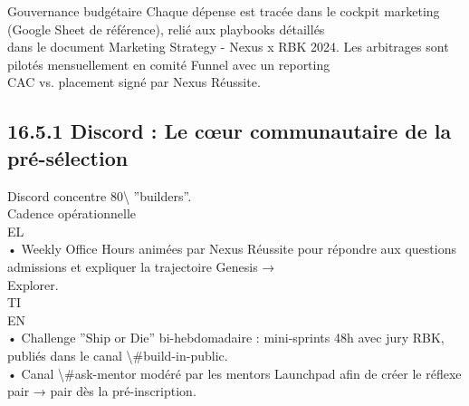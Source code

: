 \vspace{0.5em}
\vspace{0.5em}
Gouvernance budgétaire Chaque dépense est tracée dans le cockpit marketing (Google Sheet de référence), relié aux playbooks détaillés\\
dans le document Marketing Strategy - Nexus x RBK 2024. Les arbitrages sont pilotés mensuellement en comité Funnel avec un reporting\\
CAC vs. placement signé par Nexus Réussite.\\
\vspace{0.5em}
\vspace{0.5em}
\subsection{16.5.1 Discord : Le cœur communautaire de la pré-sélection}
Discord concentre 80\textbackslash{}%
”builders”.\\
\vspace{0.5em}
Cadence opérationnelle\\
\vspace{0.5em}
\vspace{0.5em}
\vspace{0.5em}
\vspace{0.5em}
EL\\
• Weekly Office Hours animées par Nexus Réussite pour répondre aux questions admissions et expliquer la trajectoire Genesis →\\
Explorer.\\
\vspace{0.5em}
\vspace{0.5em}
\vspace{0.5em}
\vspace{0.5em}
TI\\
EN\\
• Challenge ”Ship or Die” bi-hebdomadaire : mini-sprints 48h avec jury RBK, publiés dans le canal \textbackslash{}#build-in-public.\\
\vspace{0.5em}
• Canal \textbackslash{}#ask-mentor modéré par les mentors Launchpad afin de créer le réflexe pair → pair dès la pré-inscription.\\
\vspace{0.5em}
\vspace{0.5em}
\vspace{0.5em}
